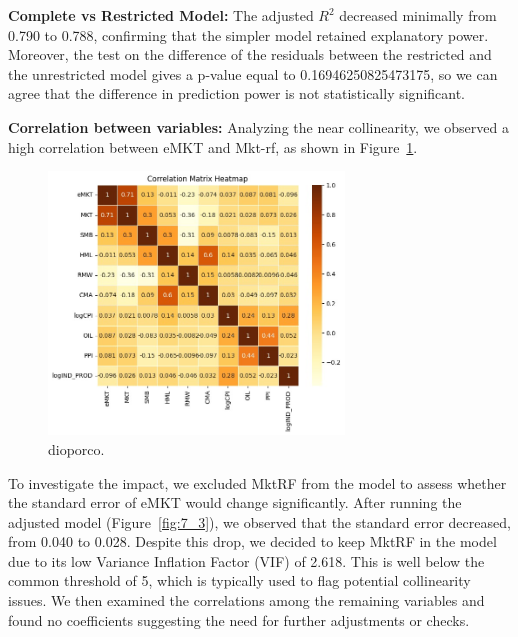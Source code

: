 \textbf{Complete vs Restricted Model:} The adjusted $R^2$ decreased minimally from 0.790 to 0.788, confirming that the simpler 
model retained explanatory power. 
Moreover, the test on the difference of the residuals between the restricted and the unrestricted model gives a p-value 
equal to 0.16946250825473175, so we can agree that the difference in prediction power is not statistically significant.

\textbf{Correlation between variables:} Analyzing the near collinearity, we observed a high correlation between eMKT and 
Mkt-rf, as shown in Figure~\ref{fig:correlation}. 

\begin{figure}[h!]
    \centering
    \includegraphics[width=0.7\textwidth]{images/correlation.jpeg}
    \caption{dioporco.}\label{fig:correlation}
\end{figure}

To investigate the impact, we excluded MktRF from the model to assess whether the standard error of eMKT would change
significantly.
After running the adjusted model (Figure~\ref{fig:7_3}), we observed that the standard error decreased, from 0.040 to 0.028.
Despite this drop, we decided to keep MktRF in the model due to its low Variance Inflation Factor (VIF) of 2.618.
This is well below the common threshold of 5, which is typically used to flag potential collinearity issues.
We then examined the correlations among the remaining variables and found no coefficients suggesting the need for further
 adjustments or checks.

